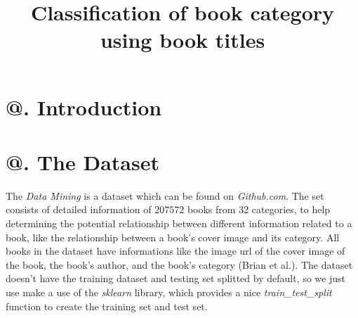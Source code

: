\documentclass[jou,apacite, 10px]{apa6}
\title{Classification of book category using book titles}
\makeatletter
\newcommand*{\rom}[1]{\expandafter\@slowromancap\romannumeral #1@}
\makeatother
\begin{document}
\maketitle    
                        
\section{\rom{1}. Introduction}


\section{\rom{2}. The Dataset}
The \textit{Data Mining} is a dataset which can be found on \textit{Github.com}. The set consists of detailed information of $207572$  books from 32 categories, to help determining the potential relationship between different information related to a book, like the relationship between a book's cover image and its category. All books in the dataset have informations like the image url of the cover image of the book, the book's author, and the book's category (Brian et al.). The dataset doesn't have the training dataset and testing set splitted by default, so we just use make a use of the \textit{sklearn} library, which provides a nice \textit{train\_test\_split} function to create the training set and test set.
\end{document}
